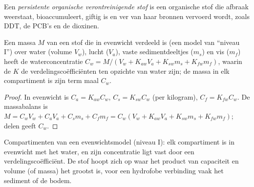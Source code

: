 \begin{definition}\label{def:b3:environmental-toxicology:pop}
Een \emph{persistente organische verontreinigende stof}
is een organische stof die afbraak weerstaat, bioaccumuleert, giftig is
en ver van haar bronnen vervoerd wordt, zoals DDT, de PCB's en de
dioxinen.
\end{definition}

\begin{proposition}\label{prop:b3:environmental-toxicology:level-one}
Een massa $M$ van een stof die in evenwicht verdeeld is (een model van ``niveau I'') over water
(volume $V_w$), lucht ($V_a$), vaste sedimentdeeltjes ($m_s$) en vis ($m_f$) heeft de waterconcentratie
$C_w = M/(V_w + K_{aw}V_a + K_{sw}m_s + K_{fw}m_f)$, waarin de $K$ de verdelingscoëfficiënten ten opzichte van
water zijn; de massa in elk compartiment is zijn term maal $C_w$.
\end{proposition}

\begin{proof}
In evenwicht is $C_a = K_{aw}C_w$, $C_s = K_{sw}C_w$ (per kilogram), $C_f = K_{fw}C_w$. De massabalans is
$M = C_wV_w + C_aV_a + C_sm_s + C_fm_f = C_w(V_w + K_{aw}V_a + K_{sw}m_s + K_{fw}m_f)$; delen geeft $C_w$.
\end{proof}

\begin{omfigure}

{\small Compartimenten van een evenwichtsmodel (niveau I): elk
compartiment is in evenwicht met het water, en zijn concentratie ligt
vast door een verdelingscoëfficiënt. De stof hoopt zich op waar het
product van capaciteit en volume (of massa) het grootst is, voor een
hydrofobe verbinding vaak het sediment of de bodem.}
\end{omfigure}

